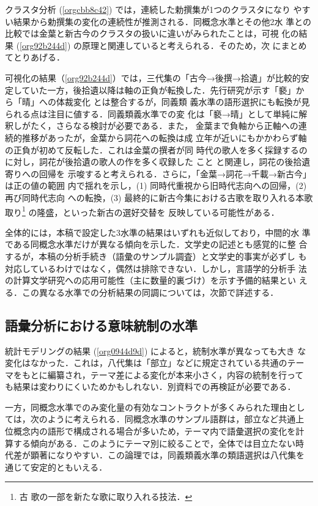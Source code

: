 \documentclass[submit]{ipsj}
\renewcommand{\ref}{\cref}
\begin{document}
クラスタ分析 (\ref{orgcbb8c42}) では，連続した勅撰集が1つのクラスタになり
やすい結果から勅撰集の変化の連続性が推測される．同概念水準とその他2水
準との比較では金葉と新古今のクラスタの扱いに違いがみられたことは，可視
化の結果 (\ref{org92b244d}) の原理と関連していると考えられる．そのため，次
にまとめてとりあげる．

可視化の結果（\ref{org92b244d}）では，三代集の「古今→後撰→拾遺」が比較的安
定していた一方，後拾遺以降は軸の正負が転換した．先行研究が示す「褻」か
ら「晴」への体裁変化 \cite{ueno1976Koshui} とは整合するが，同義類
義水準の語形選択にも転換が見られる点は注目に値する．同義類義水準での変
化は「褻→晴」として単純に解釈しがたく，さらなる検討が必要である．また，
金葉まで負軸から正軸への連続的推移があったが，金葉から詞花への転換は成
立年が近いにもかかわらず軸の正負が初めて反転した．これは金葉の撰者が同
時代の歌人を多く採録するのに対し，詞花が後拾遺の歌人の作を多く収録した
こと \cite{matsuda1939Shika} と関連し，詞花の後拾遺寄りへの回帰を
示唆すると考えられる．さらに，「金葉→詞花→千載→新古今」は正の値の範囲
内で揺れを示し，(1) 同時代重視から旧時代志向への回帰，(2) 再び同時代志向
への転換，(3) 最終的に新古今集における古歌を取り入れる本歌取り\footnote{古
歌の一部を新たな歌に取り入れる技法．} の隆盛，といった新古の選好交替を
反映している可能性がある．

全体的には，本稿で設定した3水準の結果はいずれも近似しており，中間的水
準である同概念水準だけが異なる傾向を示した．文学史の記述とも感覚的に整
合するが，本稿の分析手続き（語彙のサンプル調査）と文学史的事実が必ずし
も対応しているわけではなく，偶然は排除できない．しかし，言語学的分析手
法の計算文学研究への応用可能性（主に数量的裏づけ）を示す予備的結果とい
える．この異なる水準での分析結果の同調については，次節で詳述する．
\subsection{語彙分析における意味統制の水準\label{orgdd1e386}}
\label{sec:org1ffb5bd}
統計モデリングの結果 (\ref{org0944d9d}) によると，統制水準が異なっても大き
な変化はなかった．これは，八代集は「部立」などに規定されている共通のテー
マをもとに編纂され，テーマ差による変化が本来小さく，内容の統制を行って
も結果は変わりにくいためかもしれない．別資料での再検証が必要である．

一方，同概念水準でのみ変化量の有効なコントラクトが多くみられた理由とし
ては，次のように考えられる．同概念水準のサンプル語群は，部立など共通上
位概念内の語形で構成される場合が多いため，テーマ内で語彙選択の変化を計
算する傾向がある．このようにテーマ別に絞ることで，全体では目立たない時
代差が顕著になりやすい．この論理では，同義類義水準の類語選択は八代集を
通じて安定的ともいえる．
\end{document}
